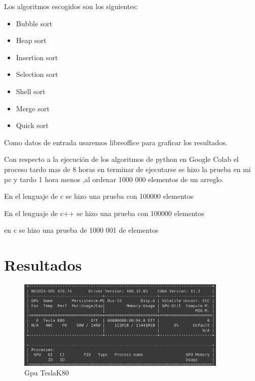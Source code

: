 \documentclass[a4paper]{article}
\begin{document}
Los algoritmos escogidos son los siguientes:

\begin{itemize}


\item  Bubble sort

\item Heap sort

\item Insertion sort

\item Selection sort

\item Shell sort

\item  Merge sort

\item Quick sort

\end{itemize}

Como datos de entrada usaremos libreoffice para graficar los resultados.

Con  respecto a la ejecución de los algoritmos de python  en Google Colab el proceso tardo mas de 8 horas en terminar de ejecutarse se hizo la prueba en mi pc y tardo 1 hora  menos ,al ordenar 1000 000 elementos de un arreglo.

En el lenguaje de c se hizo una prueba con 100000 elementos 

En el lenguaje de c++ se hizo una prueba con 100000 elementos 

en c se hizo una prueba de 1000 001 de elementos 











\section{Resultados}


\begin{figure}[H]%
\centering
\includegraphics[width=10cm]{imagenes/arq2.png}
\caption{Gpu TeslaK80}
\end{figure}
\end{document}
